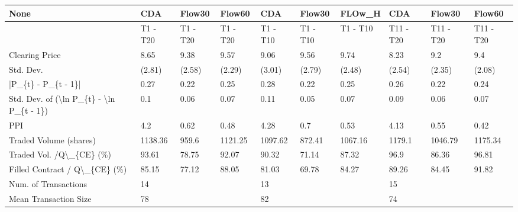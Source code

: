 \begin{tabular}{llllllllll}
\hline
 None                                                      & CDA      & Flow30    & Flow60    & CDA      & Flow30    & FLOw\_H   & CDA       & Flow30     & Flow60     \\
\hline
                                                           & T1 - T20 & T1 - T20 & T1 - T20 & T1 - T10 & T1 - T10 & T1 - T10 & T11 - T20 & T11 - T20 & T11 - T20 \\
 Clearing Price                                            & 8.65     & 9.38     & 9.57     & 9.06     & 9.56     & 9.74     & 8.23      & 9.2       & 9.4       \\
 Std. Dev.                                                 & (2.81)   & (2.58)   & (2.29)   & (3.01)   & (2.79)   & (2.48)   & (2.54)    & (2.35)    & (2.08)    \\
 |P\_\{t\} - P\_\{t - 1\}|                                       & 0.27     & 0.22     & 0.25     & 0.28     & 0.22     & 0.25     & 0.26      & 0.22      & 0.24      \\
 Std. Dev. of (\textbackslash{}ln P\_\{t\} - \textbackslash{}ln P\_\{t - 1\})                  & 0.1      & 0.06     & 0.07     & 0.11     & 0.05     & 0.07     & 0.09      & 0.06      & 0.07      \\
 PPI                                                       & 4.2      & 0.62     & 0.48     & 4.28     & 0.7      & 0.53     & 4.13      & 0.55      & 0.42      \\
 Traded Volume (shares)                                    & 1138.36  & 959.6    & 1121.25  & 1097.62  & 872.41   & 1067.16  & 1179.1    & 1046.79   & 1175.34   \\
 Traded Vol. /Q\textbackslash{}\_\{CE\} (\%)                                  & 93.61    & 78.75    & 92.07    & 90.32    & 71.14    & 87.32    & 96.9      & 86.36     & 96.81     \\
 Filled Contract / Q\textbackslash{}\_\{CE\} (\%)                             & 85.15    & 77.12    & 88.05    & 81.03    & 69.78    & 84.27    & 89.26     & 84.45     & 91.82     \\
 Num. of Transactions                                      & 14       &          &          & 13       &          &          & 15        &           &           \\
 Mean Transaction Size                                     & 78       &          &          & 82       &          &          & 74        &           &           \\

\end{tabular}
